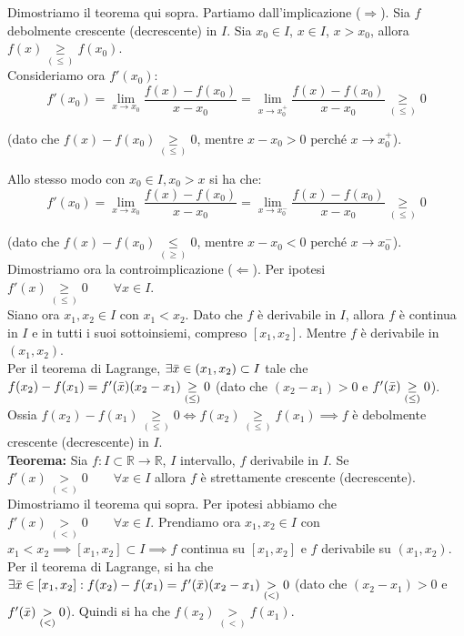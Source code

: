 \documentclass{article}
\begin{document}
\noindent Dimostriamo il teorema qui sopra. Partiamo dall'implicazione ($\Rightarrow$). Sia $f$ debolmente crescente (decrescente) in $I$. Sia $x_0 \in I$, $x \in I$, $x > x_0$, allora $f(x) \underset{(\leq)}{\geq} f(x_0)$.\\
Consideriamo ora $f'(x_0)$:
\begin{equation*}
    f'(x_0) = \lim_{x \to x_0} \frac{f(x) - f(x_0)}{x - x_0} = \lim_{x \to x_0^+} \frac{f(x) - f(x_0)}{x - x_0} \underset{(\leq)}{\geq} 0
\end{equation*}

\noindent (dato che $f(x) - f(x_0) \underset{(\leq)}{\geq} 0$, mentre $x - x_0 > 0$ perché $x \to x_0^+$).

\noindent Allo stesso modo con $x_0 \in I, x_0 > x$ si ha che:
\begin{equation*}
    f'(x_0) = \lim_{x \to x_0} \frac{f(x) - f(x_0)}{x - x_0} = \lim_{x \to x_0^-} \frac{f(x) - f(x_0)}{x - x_0} \underset{(\leq)}{\geq} 0
\end{equation*}

\noindent (dato che $f(x) - f(x_0) \underset{(\geq)}{\leq} 0$, mentre $x - x_0 < 0$ perché $x \to x_0^-$).\\
Dimostriamo ora la controimplicazione ($\Leftarrow$). Per ipotesi $f'(x) \underset{(\leq)}{\geq} 0 \qquad \forall x \in I$.\\
Siano ora $x_1, x_2 \in I$ con $x_1 < x_2$. Dato che $f$ è derivabile in $I$, allora $f$ è continua in $I$ e in tutti i suoi sottoinsiemi, compreso $[x_1, x_2]$. Mentre $f$ è derivabile in $(x_1, x_2)$.\\
Per il teorema di Lagrange, $\exists \Bar{x} \in (x_1, x_2) \subset I$ tale che $f(x_2) - f(x_1) = f'(\Bar{x})(x_2 - x_1) \underset{(\leq)}{\geq} 0$ (dato che $(x_2 - x_1) > 0$ e $f'(\Bar{x}) \underset{(\leq)}{\geq} 0$). Ossia $f(x_2) - f(x_1) \underset{(\leq)}{\geq} 0 \iff f(x_2) \underset{(\leq)}{\geq} f(x_1) \implies f$ è debolmente crescente (decrescente) in $I$.\\

\noindent\textbf{Teorema:} Sia $f: I \subset \mathbb{R} \xrightarrow{} \mathbb{R}$, $I$ intervallo, $f$ derivabile in $I$. Se $f'(x) \underset{(<)}{>} 0 \qquad \forall x \in I$ allora $f$ è strettamente crescente (decrescente).\\

\noindent Dimostriamo il teorema qui sopra. Per ipotesi abbiamo che $f'(x) \underset{(<)}{>} 0 \qquad \forall x \in I$. Prendiamo ora $x_1, x_2 \in I$ con $x_1 < x_2 \implies [x_1, x_2] \subset I \implies f$ continua su $[x_1, x_2]$ e $f$ derivabile su $(x_1, x_2)$.\\
Per il teorema di Lagrange, si ha che $\exists \Bar{x} \in [x_1, x_2] : f(x_2) - f(x_1) = f'(\Bar{x})(x_2 - x_1) \underset{(<)}{>} 0$ (dato che $(x_2 - x_1) > 0$ e $f'(\Bar{x}) \underset{(<)}{>} 0$). Quindi si ha che $f(x_2) \underset{(<)}{>} f(x_1)$.
\end{document}
